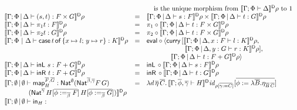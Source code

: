 \documentclass[runningheads]{llncs}
\renewcommand{\id}{\mathit{id}}
\newcommand{\map}{\mathsf{map}}
\renewcommand{\id}{\mathit{id}}
\newcommand{\inl}{\mathsf{inL}\,}
\newcommand{\inr}{\mathsf{inR}\,}
\begin{document}
\begin{figure*}
{\begin{minipage}[t]{0.5\textwidth}
\[\begin{array}{lll}
& & \hspace*{0.1in} \mbox{ is the unique morphism from }
\dsem{\Gamma;\Phi\vdash \Delta}\rho \mbox{ to } 1\\ 
\dsem{\Gamma;\Phi \,|\, \Delta \vdash (s,t) : F \times G} \rho& = &
\dsem{\Gamma;\Phi \,|\, \Delta \vdash s: F} \rho\times
\dsem{\Gamma;\Phi \,|\, \Delta \vdash t : G} \rho\\
\dsem{\Gamma;\Phi \,|\, \Delta \vdash \pi_1 t : F} \rho& = &
\pi_1 \circ \dsem{\Gamma;\Phi \,|\, \Delta \vdash t : F \times G}\rho\\
\dsem{\Gamma;\Phi \,|\, \Delta \vdash \pi_2 t : G}\rho & = &
\pi_2 \circ \dsem{\Gamma;\Phi \,|\, \Delta \vdash t : F \times
  G} \rho\\
\dsem{\Gamma;\Phi~|~\Delta \vdash \cse{t}{x \mapsto l}{y \mapsto r} :
  K}\rho & = & \eval \circ \langle \curry \,[\dsem{\Gamma;\Phi
    \,|\, \Delta, x : F \vdash l : K}\rho,\\
   & & \hspace*{0.79in} \dsem{\Gamma;\Phi \,|\, \Delta, y
    : G \vdash r : K}\rho],\\
   & &  \hspace*{0.5in} \dsem{\Gamma;\Phi \,|\, \Delta \vdash t :
  F + G} \rho\rangle\\   
\dsem{\Gamma;\Phi \,|\, \Delta \vdash \inl \,s: F + G} \rho& = &
\inl \circ \dsem{\Gamma;\Phi \,|\, \Delta \vdash s: F}\rho\\
\dsem{\Gamma;\Phi \,|\, \Delta \vdash \inr \,t: F + G}\rho & = & 
\inr \circ \dsem{\Gamma;\Phi \,|\, \Delta \vdash t : G}\rho\\
\llbracket \Gamma;\emptyset \,|\, \emptyset \vdash \map^{\ol{F},\ol{G}}_H
  : \Nat^\emptyset (\Nat^{\ol\beta,\ol\gamma} F\,G)
& = & \lambda d\, \ol\eta\,\ol{C}.\,
\dsem{\Gamma; \ol{\phi},\ol{\gamma}\vdash H}\id_{\rho[\ol{\gamma:=
      C}]}[\ol{\phi := \lambda \ol B. \eta_{\ol B\, \ol C}}]\\ 
\hspace*{0.5in}
  (\Nat^{\ol{\gamma}}\,H[\ol{\phi :=_{\ol{\beta}} F}]\,H[\ol{\phi
      :=_{\ol{\beta}} G}]) \rrbracket^{\mathsf D} \rho & &\\
\llbracket \Gamma;\emptyset \,|\, \emptyset \vdash \tin_H :

\end{array}\]
\end{minipage}}
\end{figure*}
\end{document}
